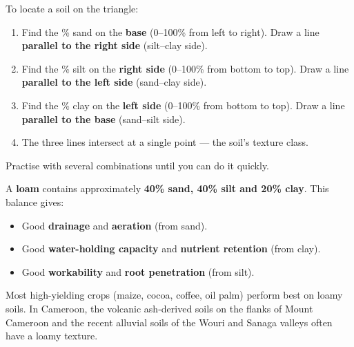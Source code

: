\documentclass[11pt]{article}
\begin{document}
\begin{aretenir}
To locate a soil on the triangle:
\begin{enumerate}
\item Find the \% sand on the \textbf{base} (0–100\% from left to right). Draw a line \textbf{parallel to the right side} (silt–clay side).
\item Find the \% silt on the \textbf{right side} (0–100\% from bottom to top). Draw a line \textbf{parallel to the left side} (sand–clay side).
\item Find the \% clay on the \textbf{left side} (0–100\% from bottom to top). Draw a line \textbf{parallel to the base} (sand–silt side).
\item The three lines intersect at a single point — the soil's texture class.
\end{enumerate}
Practise with several combinations until you can do it quickly.
\end{aretenir}

\begin{propriete}
A \textbf{loam} contains approximately \textbf{40\% sand, 40\% silt and 20\% clay}. This balance gives:
\begin{itemize}
\item Good \textbf{drainage} and \textbf{aeration} (from sand).
\item Good \textbf{water-holding capacity} and \textbf{nutrient retention} (from clay).
\item Good \textbf{workability} and \textbf{root penetration} (from silt).
\end{itemize}
Most high-yielding crops (maize, cocoa, coffee, oil palm) perform best on loamy soils. In Cameroon, the volcanic ash-derived soils on the flanks of Mount Cameroon and the recent alluvial soils of the Wouri and Sanaga valleys often have a loamy texture.
\end{propriete}
\end{document}
